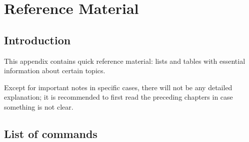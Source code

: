\documentclass[11pt,a4paper,draft]{book}
\begin{document}
\appendix
\chapter{Reference Material}
\section{Introduction}
This appendix contains quick reference material: lists and tables with
essential information about certain topics.

Except for important notes in specific cases, there will not be any
detailed explanation; it is recommended to first read the preceding
chapters in case something is not clear.

\section{List of commands}
\label{list-of-opcodes}
\end{document}
